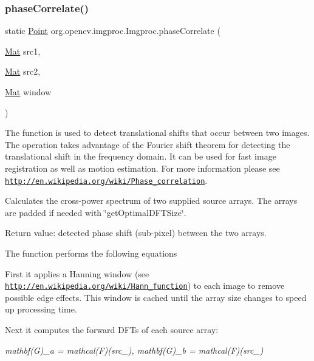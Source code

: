 \subsubsection{\texorpdfstring{phase\+Correlate()}{phaseCorrelate()}\hspace{0.1cm}{\footnotesize\ttfamily [1/2]}}
{\footnotesize\ttfamily static \mbox{\hyperlink{classorg_1_1opencv_1_1core_1_1_point}{Point}} org.\+opencv.\+imgproc.\+Imgproc.\+phase\+Correlate (\begin{DoxyParamCaption}\item[{\mbox{\hyperlink{classorg_1_1opencv_1_1core_1_1_mat}{Mat}}}]{src1,  }\item[{\mbox{\hyperlink{classorg_1_1opencv_1_1core_1_1_mat}{Mat}}}]{src2,  }\item[{\mbox{\hyperlink{classorg_1_1opencv_1_1core_1_1_mat}{Mat}}}]{window }\end{DoxyParamCaption})\hspace{0.3cm}{\ttfamily [static]}}

The function is used to detect translational shifts that occur between two images. The operation takes advantage of the Fourier shift theorem for detecting the translational shift in the frequency domain. It can be used for fast image registration as well as motion estimation. For more information please see \href{http://en.wikipedia.org/wiki/Phase_correlation}{\tt http\+://en.\+wikipedia.\+org/wiki/\+Phase\+\_\+correlation}.

Calculates the cross-\/power spectrum of two supplied source arrays. The arrays are padded if needed with \char`\"{}get\+Optimal\+D\+F\+T\+Size\char`\"{}.

Return value\+: detected phase shift (sub-\/pixel) between the two arrays.

The function performs the following equations


\begin{DoxyItemize}
\item First it applies a Hanning window (see \href{http://en.wikipedia.org/wiki/Hann_function}{\tt http\+://en.\+wikipedia.\+org/wiki/\+Hann\+\_\+function}) to each image to remove possible edge effects. This window is cached until the array size changes to speed up processing time. 
\item Next it computes the forward D\+F\+Ts of each source array\+: 
\end{DoxyItemize}

{\itshape mathbf(\+G)\+\_\+a = mathcal(\+F)(src\+\_), mathbf(\+G)\+\_\+b = mathcal(\+F)(src\+\_)}

